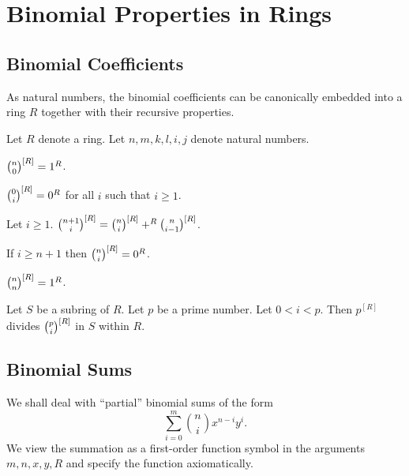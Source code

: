 \documentclass[11pt]{article}
\begin{document}
\section{Binomial Properties in Rings}

\subsection{Binomial Coefficients}

As natural numbers, the binomial coefficients can be 
canonically embedded 
into a ring $R$ together with their recursive properties.

\begin{forthel}

Let $R$ denote a ring.
Let $n,m,k,l,i,j$ denote natural numbers.

\begin{lemma}
${n \choose 0}^{[R]} = 1^{R}$.
\end{lemma}

\begin{lemma}
${0 \choose i}^{[R]} = 0^{R}$ for all $i$ such that $i \geq 1$.
\end{lemma}

\begin{lemma} Let $i \geq 1$.
${n+1 \choose i}^{[R]} = {n \choose i}^{[R]} +^{R} {n \choose i-1}^{[R]}$.
\end{lemma}

\begin{lemma}
If $i \geq n + 1$ then ${n \choose i}^{[R]} = 0^{R}$.
\end{lemma}

\begin{theorem} 
${n \choose n}^{[R]} = 1^{R}$.
\end{theorem}

\begin{lemma} Let $S$ be a subring of $R$.
Let $p$ be a prime number.
Let $0 < i < p$. Then
$p^{[R]}$ divides ${p \choose i}^{[R]}$ in $S$ within $R$.
\end{lemma}

\end{forthel}

\subsection{Binomial Sums}

We shall deal with ``partial'' binomial sums of the form
\[\sum_{i=0}^m {n \choose i} x^{n-i} y^{i}.\]
We view the summation as a first-order function symbol in the 
arguments $m,n,x,y,R$ and specify the function axiomatically.
\end{document}
